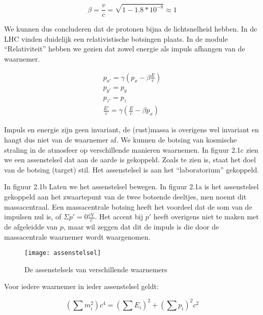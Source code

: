 \begin{equation}
\beta=\frac{v}{c}=\sqrt{1-1.8*10^{-8}}\approx1
\end{equation}


We kunnen dus concluderen dat de protonen bijna de lichtsnelheid hebben.
In de LHC vinden duidelijk een relativistische botsingen plaats. In
de module ``Relativiteit'' hebben we gezien dat zowel energie als
impuls afhangen van de waarnemer. 

\begin{equation}
\begin{array}{c}
p_{x'}=\gamma\left(p_{x}-\beta\frac{E}{c}\right)\\
p_{y'}=p_{y}\\
p_{z'}=p_{z}\\
\frac{E'}{c}=\gamma\left(\frac{E}{c}-\beta p_{x}\right)
\end{array}
\end{equation}


Impuls en energie zijn geen invariant, de (rust)massa is overigens
wel invariant en hangt dus niet van de waarnemer af. We kunnen de
botsing van kosmische straling in de atmosfeer op verschillende manieren
waarnemen. In figuur 2.1c zien we een assenstelsel dat aan de aarde
is gekoppeld. Zoals te zien is, staat het doel van de botsing (target)
stil. Het assenstelsel is aan het ``laboratorium'' gekoppeld.

In figuur 2.1b Laten we het assenstelsel bewegen. In figuur 2.1a is
het assenstelsel gekoppeld aan het zwaartepunt van de twee botsende
deeltjes, men noemt dit massacentraal. Een massacentrale botsing heeft
het voordeel dat de som van de impulsen nul is, of $\Sigma p'=0\frac{\mathrm{eV}}{c}$.
Het accent bij $p'$ heeft overigens niet te maken met de afgeleidde
van $p$, maar wil zeggen dat dit de impuls is die door de massacentrale
waarnemer wordt waargenomen. 

\begin{figure}[H]
\noindent \begin{centering}
\texttt{[image: assenstelsel]}
\par\end{centering}

\caption{De assenstelsels van verschillende waarnemers}
\end{figure}


Voor iedere waarnemer in ieder assenstelsel geldt:

\begin{equation}
\left(\sum m_{i}^{2}\right)c^{4}
=\left(\sum E_{i}\right)^{2}+\left(\sum p_{i}\right)^{2}c^{2}
\end{equation}


